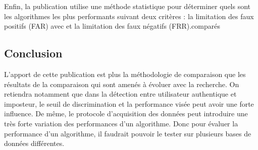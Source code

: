 Enfin, la publication utilise une méthode statistique pour déterminer quels sont les algorithmes les plus performants suivant deux critères : la limitation des faux positifs (FAR) avec  et la limitation des faux négatifs (FRR).comparés

\subsection{Conclusion}
L'apport de cette publication est plus la méthodologie de comparaison que les résultats de la comparaison qui sont amenés à évoluer avec la recherche. On retiendra notamment que dans la détection entre utilisateur authentique et imposteur, le seuil de discrimination et la performance visée peut avoir une
forte influence. De même, le protocole d'acquisition des données peut introduire une très forte variation des performances d'un algorithme. Donc pour évaluer la performance d'un algorithme, il faudrait pouvoir le tester sur plusieurs bases de données différentes.